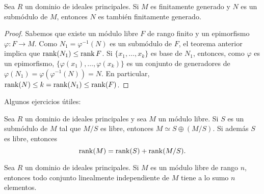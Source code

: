 


\begin{corollary}
Sea $R$ un dominio de ideales principales. Si $M$ es finitamente generado y $N$ 
es un submódulo de $M$, entonces $N$ es también finitamente generado.  
\end{corollary}

\begin{proof}
Sabemos que existe un módulo libre $F$ de rango finito y un epimorfismo 
$\varphi\colon F\to M$. Como $N_1=\varphi^{-1}(N)$ es un submódulo de $F$, el teorema anterior
implica que 
$\operatorname{rank}(N_1)\leq\operatorname{rank} F$. Si $\{x_1,\dots,x_k\}$ es base de $N_1$, entonces, como $\varphi$ es un epimorfismo, $\{\varphi(x_1),\dots,\varphi(x_k)\}$ es un conjunto de generadores de 
$\varphi(N_1)=\varphi(\varphi^{-1}(N))=N$. En particular, $\operatorname{rank}(N)\leq k=\operatorname{rank}(N_1)\leq\operatorname{rank}(F)$. 
\end{proof}

Algunos ejercicios útiles:

\begin{exercise}
\label{xca:rank}
    Sea $R$ un dominio de ideales principales  
	y sea $M$ un módulo libre. Si 
	$S$ es un submódulo de $M$ tal que $M/S$ es libre, entonces $M\simeq S\oplus (M/S)$. Si además 
	$S$ es libre, entonces 
	\[
	\operatorname{rank}(M)=\operatorname{rank}(S)+\operatorname{rank}(M/S).
	\] 
\end{exercise}

\begin{exercise}
\label{xca:n_elements}
Sea $R$ un dominio de ideales principales. 
Si $M$ es un módulo libre de rango $n$, entonces todo conjunto linealmente independiente de $M$ tiene
a lo sumo $n$ elementos. 
\end{exercise}

